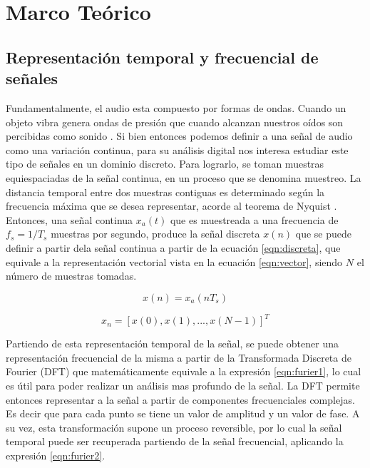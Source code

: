 \section{Marco Teórico}


\subsection{Representación temporal y frecuencial de señales}
Fundamentalmente, el audio esta compuesto por formas de ondas. Cuando un objeto vibra genera ondas de presión que cuando alcanzan nuestros oídos son percibidas como sonido \cite{ritmo}. Si bien entonces podemos definir a una señal de audio como una variación continua, para su análisis digital nos interesa estudiar este tipo de señales en un dominio discreto. Para lograrlo, se toman muestras equiespaciadas de la señal continua, en un proceso que se denomina muestreo. La distancia temporal entre dos muestras contiguas es determinado según la frecuencia máxima que se desea representar, acorde al teorema de Nyquist \cite{openheim}. Entonces, una señal continua $x_{a}(t)$ que es muestreada a una frecuencia de $f_{s} = 1 / T_{s}$ muestras por segundo, produce la señal discreta $x(n)$ que se puede definir a partir dela señal continua a partir de la ecuación \ref{eqn:discreta}, que equivale a la representación vectorial vista en la ecuación   \ref{eqn:vector}, siendo $N$ el número de muestras tomadas. 

\begin{equation}
\label{eqn:discreta}
	x(n) = x_{a}(nT_{s})
\end{equation} 

\begin{equation}
\label{eqn:vector}
	x_{n} = [x(0), x(1),..., x(N-1) ]^{T}
\end{equation} 


Partiendo de esta representación temporal de la señal, se puede obtener una representación frecuencial de la misma a partir de la Transformada Discreta de Fourier (DFT) \cite{openheim} que matemáticamente equivale a la expresión \ref{eqn:furier1}, lo cual es útil para poder realizar un análisis mas profundo de la señal. La DFT permite entonces representar a la señal a partir de componentes frecuenciales complejas. Es decir que para cada punto se tiene un valor de amplitud y un valor de fase. A su vez, esta transformación supone un proceso reversible, por lo cual la señal temporal puede ser recuperada partiendo de la señal frecuencial, aplicando la expresión \ref{eqn:furier2}. 


